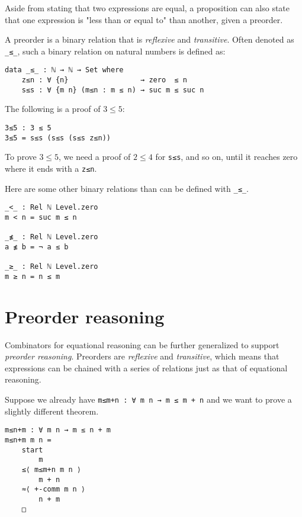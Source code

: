 \documentclass[../thesis.tex]{subfiles}
\begin{document}
Aside from stating that two expressions are equal, a proposition can also state
that one expression is "less than or equal to" than another, given a preorder.

A preorder is a binary relation that is \textit{reflexive} and \textit{transitive}.
Often denoted as {\lstinline|_≤_|}, such a binary relation on natural numbers is
defined as:

\begin{lstlisting}
data _≤_ : ℕ → ℕ → Set where
    z≤n : ∀ {n}                 → zero  ≤ n
    s≤s : ∀ {m n} (m≤n : m ≤ n) → suc m ≤ suc n
\end{lstlisting}

The following is a proof of $ 3 \leq 5 $:

\begin{lstlisting}
3≤5 : 3 ≤ 5
3≤5 = s≤s (s≤s (s≤s z≤n))
\end{lstlisting}

To prove $ 3 \leq 5 $, we need a proof of $ 2 \leq 4 $ for {\lstinline|s≤s|},
and so on, until it reaches zero where it ends with a {\lstinline|z≤n|}.

Here are some other binary relations than can be defined with {\lstinline|_≤_|}.

\begin{lstlisting}
_<_ : Rel ℕ Level.zero
m < n = suc m ≤ n

_≰_ : Rel ℕ Level.zero
a ≰ b = ¬ a ≤ b

_≥_ : Rel ℕ Level.zero
m ≥ n = n ≤ m
\end{lstlisting}

\section{Preorder reasoning}

Combinators for equational reasoning can be further generalized to support \textit{preorder reasoning}.
Preorders are \textit{reflexive} and \textit{transitive},
which means that expressions can be chained with a series of relations just as that of
equational reasoning.

Suppose we already have {\lstinline|m≤m+n : ∀ m n → m ≤ m + n|} and we want to
prove a slightly different theorem.

\begin{lstlisting}
m≤n+m : ∀ m n → m ≤ n + m
m≤n+m m n =
    start
        m
    ≤⟨ m≤m+n m n ⟩
        m + n
    ≈⟨ +-comm m n ⟩
        n + m
    □
\end{lstlisting}
\end{document}

